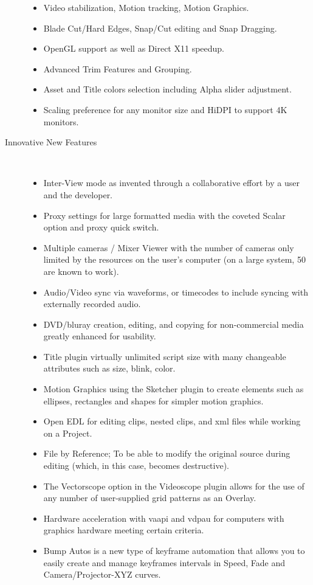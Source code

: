 \begin{description}
\begin{itemize}
                \item Video stabilization, Motion tracking, Motion Graphics.
                \item Blade Cut/Hard Edges, Snap/Cut editing and Snap Dragging.
                \item OpenGL support as well as Direct X11 speedup.
                \item Advanced Trim Features and Grouping.
                \item Asset and Title colors selection including Alpha slider adjustment.
                \item Scaling preference for any monitor size and HiDPI to support 4K monitors.
            \end{itemize}
            \item[Innovative New Features]~\\
                \begin{itemize}
                    \item Inter-View mode as invented through a collaborative effort by a user and the developer.
                    \item Proxy settings for large formatted media with the coveted Scalar option and proxy quick switch.
                    \item Multiple cameras / Mixer Viewer with the number of cameras only limited by the resources on the user’s computer (on a large system, 50 are known to work).
                    \item Audio/Video sync via waveforms, or timecodes to include syncing with externally recorded audio.
                    \item DVD/bluray creation, editing, and copying for non-commercial media greatly enhanced for usability.
                    \item Title plugin virtually unlimited script size with many changeable attributes such as size, blink, color.
                    \item Motion Graphics using the Sketcher plugin to create elements such as ellipses, rectangles and shapes for simpler motion graphics.
                    \item Open EDL for editing clips, nested clips, and xml files while working on a Project.
		    \item File by Reference; To be able to modify the original source during editing (which, in this case, becomes destructive).
                    \item The Vectorscope option in the Videoscope plugin allows for the use of any number of user-supplied grid patterns as an Overlay.
                    \item Hardware acceleration with vaapi and vdpau for computers with graphics hardware meeting certain criteria.
                    \item Bump Autos is a new type of keyframe automation that allows you to easily create and manage keyframes intervals in Speed, Fade and Camera/Projector-XYZ curves.
                \end{itemize}
\end{description}

